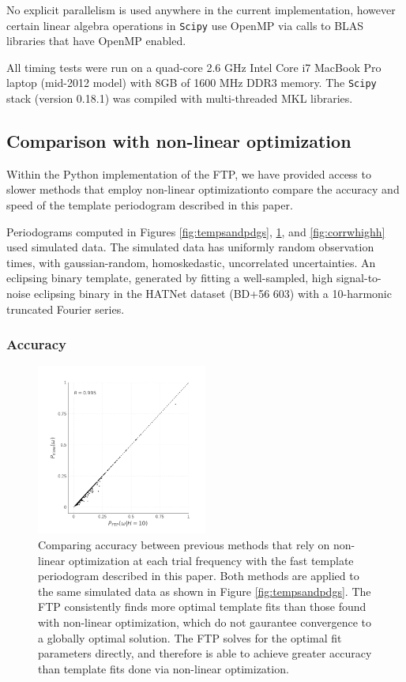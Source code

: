 \documentclass[apj]{emulateapj}
\begin{document}
No explicit parallelism is used anywhere in the current implementation, 
however certain linear algebra operations in \texttt{Scipy} use OpenMP 
via calls to BLAS libraries that have OpenMP enabled.

All timing tests were run on a quad-core 2.6 GHz Intel Core i7 MacBook 
Pro laptop (mid-2012 model) with 8GB of 1600 MHz DDR3 memory. The \texttt{Scipy} stack 
(version 0.18.1) was compiled with multi-threaded MKL libraries.

\subsection{Comparison with non-linear optimization}

Within the Python implementation of the FTP, we have provided access to slower 
methods that employ non-linear optimizationto compare the accuracy and speed 
of the template periodogram described in this paper.

Periodograms computed in Figures \ref{fig:tempsandpdgs}, \ref{fig:corrwgats},
and \ref{fig:corrwhighh} used simulated data. The simulated data has uniformly
random observation times, with gaussian-random, homoskedastic, uncorrelated 
uncertainties. An eclipsing binary template, generated by fitting a well-sampled,
high signal-to-noise eclipsing binary in the HATNet dataset (BD+56 603)
with a 10-harmonic truncated Fourier series.

\subsubsection{Accuracy}

\begin{figure}
    \centering
    \includegraphics[width=0.5\textwidth]{plots/correlation_with_nonlinopt.pdf}
    \caption{\label{fig:corrwgats} Comparing accuracy between previous methods that rely
            on non-linear optimization at each trial frequency with the fast template periodogram 
            described in this paper. Both methods are applied to the same simulated data as shown 
            in Figure \ref{fig:tempsandpdgs}.
            The FTP consistently finds more optimal template fits than 
            those found with non-linear optimization, which do not gaurantee convergence to 
            a globally optimal solution. The FTP solves for the optimal
            fit parameters directly, and therefore is able to achieve greater accuracy than template
            fits done via non-linear optimization.}
\end{figure}
\end{document}

